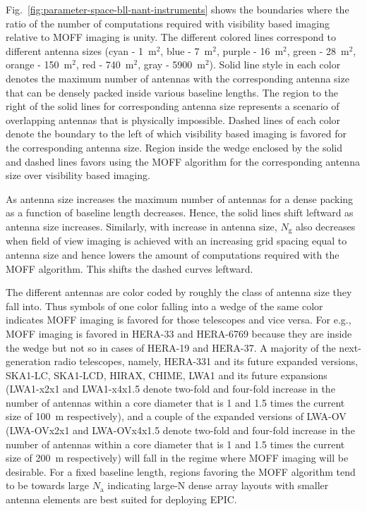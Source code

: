 \documentclass[a4paper,fleqn,usenatbib]{mnras}
\newcommand{\Nant}{N_\textrm{a}}
\newcommand{\Ngrid}{N_\textrm{g}}
\begin{document}
Fig.~\ref{fig:parameter-space-bll-nant-instruments} shows the boundaries where 
the ratio of the number of computations required with visibility based imaging 
relative to MOFF imaging is unity. The different colored lines correspond to 
different antenna sizes (cyan - 1~m$^2$, blue - 7~m$^2$, purple - 16~m$^2$, 
green - 28~m$^2$, orange - 150~m$^2$, red - 740~m$^2$, gray - 5900~m$^2$). Solid 
line style in each color denotes the maximum number of antennas with the 
corresponding antenna size that can be densely packed inside various baseline 
lengths. The region to the right of the solid lines for corresponding antenna 
size represents a scenario of overlapping antennas that is physically 
impossible. Dashed lines of each color denote the boundary to the left of which 
visibility based imaging is favored for the corresponding antenna size. Region 
inside the wedge enclosed by the solid and dashed lines favors using the MOFF 
algorithm for the corresponding antenna size over visibility based imaging. 

As antenna size increases the maximum number of antennas for a dense packing as 
a function of baseline length decreases. Hence, the solid lines shift leftward 
as antenna size increases. Similarly, with increase in antenna size, $\Ngrid$ 
also decreases when field of view imaging is achieved with an increasing grid 
spacing equal to antenna size and hence lowers the amount of computations 
required with the MOFF algorithm. This shifts the dashed curves leftward. 

The different antennas are color coded by roughly the class of antenna size 
they fall into. Thus symbols of one color falling into a wedge of the same color 
indicates MOFF imaging is favored for those telescopes and vice versa. For 
e.g., MOFF imaging is favored in HERA-33 and HERA-6769 because they are inside 
the wedge but not so in cases of HERA-19 and HERA-37. A majority of the 
next-generation radio telescopes, namely, HERA-331 and its future expanded 
versions, SKA1-LC, SKA1-LCD, HIRAX, CHIME, LWA1 and its future expansions 
(LWA1-x2x1 and LWA1-x4x1.5 denote two-fold and four-fold increase in the number 
of antennas within a core diameter that is 1 and 1.5 times the current size of 
100~m respectively), and a couple of the expanded versions of LWA-OV (LWA-OVx2x1 
and LWA-OVx4x1.5 denote two-fold and four-fold increase in the number of antennas
within a core diameter that is 1 and 1.5 times the current size of 200~m 
respectively) will fall in the regime where MOFF imaging will be desirable. For 
a fixed baseline length, regions favoring the MOFF algorithm tend to be towards 
large $\Nant$ indicating large-N dense array layouts with smaller antenna 
elements are best suited for deploying EPIC.
\end{document}

